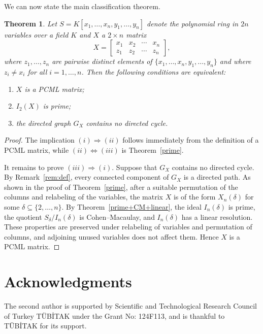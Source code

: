 \documentclass[12pt]{amsart}
\newtheorem{Theorem}{Theorem}[section]
\begin{document}
We can now state the main classification theorem.

\begin{Theorem}
\label{mainPCML}
Let $S=K[x_1, \ldots, x_n,y_1, \ldots,y_n]$ denote the polynomial ring in $2n$ variables over a field $K$ and $X$ a $2 \times n$ matrix
\[
X=
\begin{bmatrix}
x_1 & x_2 & \cdots & x_n\\
z_1 & z_2 & \cdots & z_n
\end{bmatrix},
\]
where $z_1,\ldots,z_n$ are pairwise distinct elements of $\{x_1,\ldots,x_n,y_1,\ldots,y_n\}$ and where $z_i\neq x_i$ for all $i=1,\ldots,n$.  Then the following conditions are equivalent:
\begin{enumerate}
\item[(i)] $X$ is a PCML matrix;
\item[(ii)] $I_2(X)$ is prime;
\item[(iii)] the directed graph $G_X$ contains no directed cycle.
\end{enumerate}
\end{Theorem}

\begin{proof}
The implication $(i)\Rightarrow(ii)$ follows immediately from the
definition of a PCML matrix, while $(ii)\Leftrightarrow(iii)$ is
Theorem~\ref{prime}.

It remains to prove $(iii)\Rightarrow(i)$. Suppose that $G_X$ contains
no directed cycle. By Remark~\ref{rem:def}, every connected component of $G_X$
is a directed path. As shown in the proof of Theorem~\ref{prime}, after a
suitable permutation of the columns and relabeling of the variables,
the matrix $X$ is of the form $X_n(\delta)$ for some $\delta\subseteq\{2,\ldots,n\}$. By Theorem~\ref{prime+CM+linear}, the ideal
$I_n(\delta)$ is prime, the quotient $S_\delta/I_n(\delta)$ is
Cohen--Macaulay, and $I_n(\delta)$ has a linear resolution.
These properties are preserved under relabeling of variables and
permutation of columns, and adjoining unused variables does not affect
them. Hence $X$ is a PCML matrix.
\end{proof}



\section*{Acknowledgments} The second author is supported by Scientific and Technological Research Council of Turkey T\"UB\.{I}TAK under the Grant No: 124F113, and is thankful to T\"UB\.{I}TAK for its support.
\end{document}
